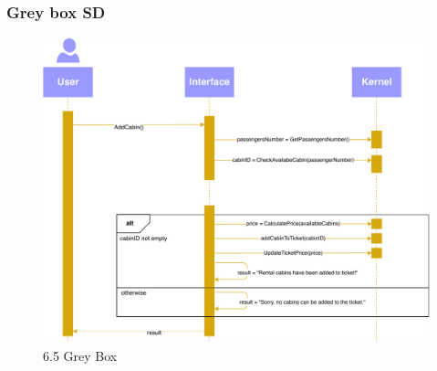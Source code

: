 
\subsubsection{Grey box SD}
\creator{\studentB}
\begin{figure}[H]
    \centering
\includegraphics[scale=0.7]{Iteration_3/Files/UC5_gb.pdf}
\caption{6.5 Grey Box}
\end{figure}
 \newpage
